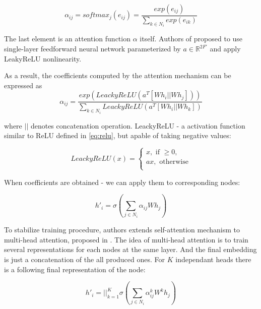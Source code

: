 \begin{equation}
   \alpha_{ij} = softmax_j(e_{ij}) = \frac{exp(e_{ij})}{\sum_{k \in N_i}exp(e_{ik})}
\end{equation}

The last element is an attention function $\alpha$ itself. Authors of \cite{GAT} proposed to use
single-layer feedforward neural network parameterized by $a \in \mathbb{R}^{2F'}$ and apply LeakyReLU nonlinearity.

As a result, the coefficients computed by the attention mechanism can be expressed as
\begin{equation}
    \alpha_{ij} = \frac{exp(LeackyReLU(a^{T}[Wh_i || Wh_j]))}{\sum_{k \in N_i}LeackyReLU(a^{T}[Wh_i || Wh_k])}
    \label{eq:final_att_coef}
 \end{equation}

where $||$ denotes concatenation operation. LeackyReLU - a activation function similar to ReLU defined in \ref{eq:relu}, but
apable of taking negative values:

\begin{equation}
    LeackyReLU(x) = 
    \begin{cases}
        x, \text{ if } \geq 0, \\
        ax, \text{ otherwise} \\
    \end{cases}
    \label{eq:leacky_relu}
\end{equation}

When coefficients are obtained - we can apply them to corresponding nodes:

\begin{equation}
    h'_i = \sigma \left( \sum_{j \in {N_i}} \alpha_{ij} W h_j \right)
    \label{eq:final_att}
 \end{equation}

To stabilize training procedure, authors extends self-attention mechanism
to multi-head attention, proposed in \cite{AttentionIsAllYouNeed}.
The idea of multi-head attention is to train several representations for each nodes at the same layer. And the final embedding
is just a concatenation of the all produced ones. For $K$ independant heads  there is a following final representation of the node:

\begin{equation}
    h'_i = ||_{k=1}^{K}  \sigma \left( \sum_{j \in {N_i}} \alpha^{k}_{ij} W^{k} h_j \right)
    \label{eq:multihead}
\end{equation}

